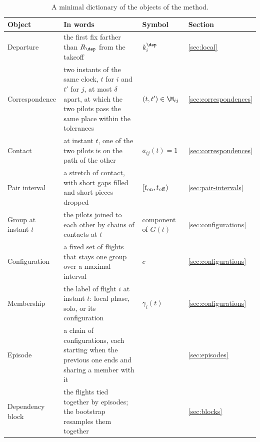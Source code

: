 \begin{table}
\centering
\small
\begin{tabularx}{\textwidth}{@{}l X l l@{}}
\toprule
Object & In words & Symbol & Section \\
\midrule
Departure & the first fix farther than $R_\dep$ from the takeoff & $k_i^\dep$ & \ref{sec:local} \\
Correspondence & two instants of the same clock, $t$ for $i$ and $t'$ for $j$, at most $\delta$ apart, at which the two pilots pass the same place within the tolerances & $(t,t')\in\M_{ij}$ & \ref{sec:correspondences} \\
Contact & at instant $t$, one of the two pilots is on the path of the other & $a_{ij}(t)=1$ & \ref{sec:correspondences} \\
Pair interval & a stretch of contact, with short gaps filled and short pieces dropped & $[t_{\rm on},t_{\rm off})$ & \ref{sec:pair-intervals} \\
Group at instant $t$ & the pilots joined to each other by chains of contacts at $t$ & component of $G(t)$ & \ref{sec:configurations} \\
Configuration & a fixed set of flights that stays one group over a maximal interval & $c$ & \ref{sec:configurations} \\
Membership & the label of flight $i$ at instant $t$: local phase, solo, or its configuration & $\gamma_i(t)$ & \ref{sec:configurations} \\
Episode & a chain of configurations, each starting when the previous one ends and sharing a member with it & & \ref{sec:episodes} \\
Dependency block & the flights tied together by episodes; the bootstrap resamples them together & & \ref{sec:blocks} \\
\bottomrule
\end{tabularx}
\caption{A minimal dictionary of the objects of the method.}
\label{tab:glossary}
\end{table}
